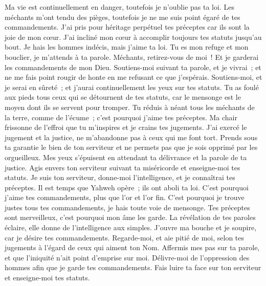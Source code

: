 \begin{multicols}{2}
Ma vie est continuellement en danger, toutefois je n'oublie pas ta loi.
Les méchants m'ont tendu des pièges, toutefois je ne me suis point égaré de tes commandements.
J'ai pris pour héritage perpétuel tes préceptes car ils sont la joie de mon cœur.
J'ai incliné mon cœur à accomplir toujours tes statuts jusqu'au bout.
 Je hais les hommes indécis, mais j'aime ta loi.
Tu es mon refuge et mon bouclier, je m'attends à ta parole.
Méchants, retirez-vous de moi~! Et je garderai les commandements de mon Dieu.
Soutiens-moi suivant ta parole, et je vivrai~; et ne me fais point rougir de honte en me refusant ce que j'espérais.
Soutiens-moi, et je serai en sûreté~; et j'aurai continuellement les yeux sur tes statuts.
Tu as foulé aux pieds tous ceux qui se détournent de tes statuts, car le mensonge est le moyen dont ils se servent pour tromper.
Tu réduis à néant tous les méchants de la terre, comme de l'écume~; c'est pourquoi j'aime tes préceptes.
Ma chair frissonne de l'effroi que tu m'inspires et je crains tes jugements.
 J'ai exercé le jugement et la justice, ne m'abandonne pas à ceux qui me font tort.
Prends sous ta garantie le bien de ton serviteur et ne permets pas que je sois opprimé par les orgueilleux.
Mes yeux s'épuisent en attendant ta délivrance et la parole de ta justice.
Agis envers ton serviteur suivant ta miséricorde et enseigne-moi tes statuts.
Je suis ton serviteur, donne-moi l'intelligence, et je connaîtrai tes préceptes.
Il est temps que Yahweh opère~; ils ont aboli ta loi.
C'est pourquoi j'aime tes commandements, plus que l'or et l'or fin.
C'est pourquoi je trouve justes tous tes commandements, je hais toute voie de mensonge.
 Tes préceptes sont merveilleux, c'est pourquoi mon âme les garde.
La révélation de tes paroles éclaire, elle donne de l'intelligence aux simples.
J'ouvre ma bouche et je soupire, car je désire tes commandements.
Regarde-moi, et aie pitié de moi, selon tes jugements à l'égard de ceux qui aiment ton Nom.
Affermis mes pas sur ta parole, et que l'iniquité n'ait point d'emprise sur moi.
Délivre-moi de l'oppression des hommes afin que je garde tes commandements.
Fais luire ta face sur ton serviteur et enseigne-moi tes statuts.

\end{multicols}
